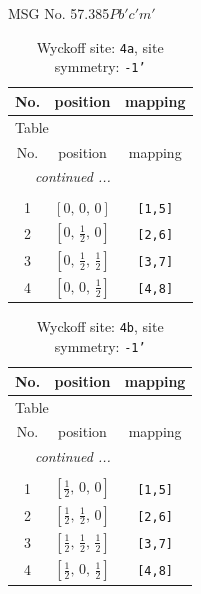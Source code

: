 \documentclass[fleqn,8pt]{jsarticle}
\begin{document}
\setcounter{MaxMatrixCols}{32}

\renewcommand{\tablename}{Table~}
\renewcommand{\figurename}{Figure~}
\begin{center}
\LARGE
MSG No. 57.385\quad$Pb'c'm'$
\end{center}
\renewcommand{\arraystretch}{1.2}
\begin{longtable}{ccc}
\caption{Wyckoff site: {\tt 4a}, site symmetry: {\tt -1'}}
 \\
 \hline \hline
No. & position & mapping \\ \hline \endfirsthead

\multicolumn{2}{l}{\tablename\ \thetable{}} \\
 \hline \hline
No. & position & mapping \\ \hline \endhead

 \hline \hline
\multicolumn{2}{r}{\footnotesize\it continued ...} \\ \endfoot

 \hline \hline
\multicolumn{2}{r}{} \\ \endlastfoot

1 & $\left[ 0,\, 0,\, 0 \right]$ & {\tt [1,5]} \\ \hline
2 & $\left[ 0,\, \frac{1}{2},\, 0 \right]$ & {\tt [2,6]} \\ \hline
3 & $\left[ 0,\, \frac{1}{2},\, \frac{1}{2} \right]$ & {\tt [3,7]} \\ \hline
4 & $\left[ 0,\, 0,\, \frac{1}{2} \right]$ & {\tt [4,8]} \\
\end{longtable}
\renewcommand{\arraystretch}{1.2}
\begin{longtable}{ccc}
\caption{Wyckoff site: {\tt 4b}, site symmetry: {\tt -1'}}
 \\
 \hline \hline
No. & position & mapping \\ \hline \endfirsthead

\multicolumn{2}{l}{\tablename\ \thetable{}} \\
 \hline \hline
No. & position & mapping \\ \hline \endhead

 \hline \hline
\multicolumn{2}{r}{\footnotesize\it continued ...} \\ \endfoot

 \hline \hline
\multicolumn{2}{r}{} \\ \endlastfoot

1 & $\left[ \frac{1}{2},\, 0,\, 0 \right]$ & {\tt [1,5]} \\ \hline
2 & $\left[ \frac{1}{2},\, \frac{1}{2},\, 0 \right]$ & {\tt [2,6]} \\ \hline
3 & $\left[ \frac{1}{2},\, \frac{1}{2},\, \frac{1}{2} \right]$ & {\tt [3,7]} \\ \hline
4 & $\left[ \frac{1}{2},\, 0,\, \frac{1}{2} \right]$ & {\tt [4,8]} \\
\end{longtable}
\end{document}
